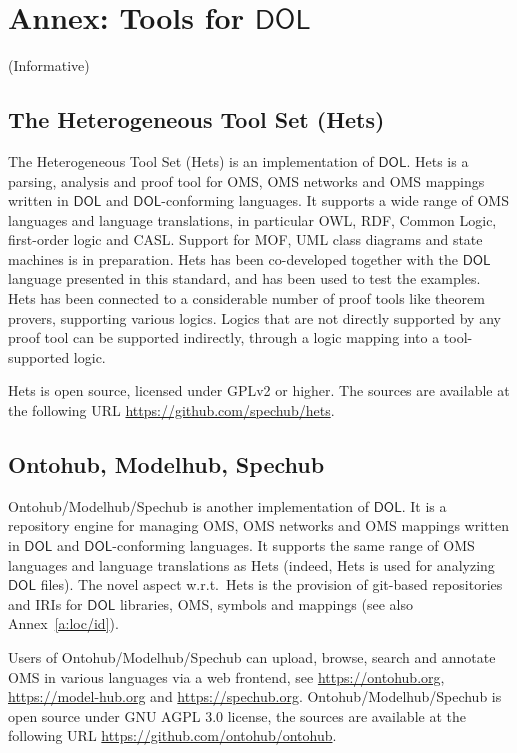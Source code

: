 \documentclass[10pt,fleqn,final]{scrreprt}
\newcommand*{\DOL}{\ensuremath{\mathsf{DOL}}\xspace}
\newcommand{\informative}[0]{{\begin{center}{\Large{(Informative})}\end{center}} \bigskip}
\newcommand{\sclause}[1]{\section{#1}}
\newcommand{\infannex}[1]{ \chapter{Annex: #1}  \informative }
\begin{document}

\infannex{Tools for \DOL}\label{a:tools}

\sclause{The Heterogeneous Tool Set (Hets)}\label{a:hets} The
Heterogeneous Tool Set (Hets) is  an implementation  of
\DOL. Hets is a parsing, analysis and proof tool
for OMS, OMS networks and OMS mappings written in \DOL and
\DOL-conforming languages.  It supports a wide range of OMS languages
and language translations, in particular OWL, RDF, Common Logic,
first-order logic and CASL. Support for MOF, UML class diagrams and
state machines is in preparation.  Hets has been co-developed together
with the \DOL language presented in this standard, and has been used to
test the examples. Hets has been connected to a considerable number of
proof tools like theorem provers, supporting various logics. Logics
that are not directly supported by any proof tool can be supported
indirectly, through a logic mapping into a tool-supported logic.

Hets  is open source, licensed under GPLv2 or higher. The sources are
available at the following URL \url{https://github.com/spechub/hets}.


\sclause{Ontohub, Modelhub, Spechub}\label{a:ontohub}

Ontohub/Modelhub/Spechub is  another implementation  of
\DOL. It is a repository engine for managing OMS, OMS networks and OMS
mappings written in \DOL and \DOL-conforming languages.  It supports the
same range of OMS languages and language translations as Hets (indeed,
Hets is used for analyzing \DOL files). The novel aspect w.r.t.\ Hets
is the provision of git-based repositories and IRIs for \DOL libraries,
OMS, symbols and mappings (see also Annex~\ref{a:loc/id}).

Users of Ontohub/Modelhub/Spechub can upload, browse, search and annotate 
OMS in various languages via a web frontend, 
see \url{https://ontohub.org}, \url{https://model-hub.org} and \url{https://spechub.org}.
Ontohub/Modelhub/Spechub is open source under GNU AGPL 3.0 license,  the sources are available at the following URL 
\url{https://github.com/ontohub/ontohub}.
\end{document}
